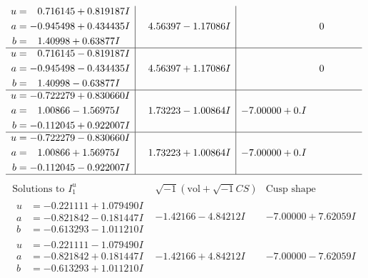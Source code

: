 \documentclass[1p]{elsarticle_modified}
\theoremstyle{definition}
\newcommand{\I}{\sqrt{-1}}
\begin{document}
$$\begin{array}{c|c|c}
\begin{aligned}
u &= \phantom{-}0.716145 + 0.819187 I \\
a &= -0.945498 + 0.434435 I \\
b &= \phantom{-}1.40998 + 0.63877 I\end{aligned}
 & \phantom{-}4.56397 - 1.17086 I & \phantom{-0.000000 } 0 \\ \hline\begin{aligned}
u &= \phantom{-}0.716145 - 0.819187 I \\
a &= -0.945498 - 0.434435 I \\
b &= \phantom{-}1.40998 - 0.63877 I\end{aligned}
 & \phantom{-}4.56397 + 1.17086 I & \phantom{-0.000000 } 0 \\ \hline\begin{aligned}
u &= -0.722279 + 0.830660 I \\
a &= \phantom{-}1.00866 - 1.56975 I \\
b &= -0.112045 + 0.922007 I\end{aligned}
 & \phantom{-}1.73223 - 1.00864 I & -7.00000 + 0. I\phantom{ +0.000000I} \\ \hline\begin{aligned}
u &= -0.722279 - 0.830660 I \\
a &= \phantom{-}1.00866 + 1.56975 I \\
b &= -0.112045 - 0.922007 I\end{aligned}
 & \phantom{-}1.73223 + 1.00864 I & -7.00000 + 0. I\phantom{ +0.000000I}\\
 \hline 
 \end{array}$$\newpage$$\begin{array}{c|c|c}  
\text{Solutions to }I^u_{1}& \I (\text{vol} + \sqrt{-1}CS) & \text{Cusp shape}\\
 \hline 
\begin{aligned}
u &= -0.221111 + 1.079490 I \\
a &= -0.821842 - 0.181447 I \\
b &= -0.613293 - 1.011210 I\end{aligned}
 & -1.42166 - 4.84212 I & -7.00000 + 7.62059 I \\ \hline\begin{aligned}
u &= -0.221111 - 1.079490 I \\
a &= -0.821842 + 0.181447 I \\
b &= -0.613293 + 1.011210 I\end{aligned}
 & -1.42166 + 4.84212 I & -7.00000 - 7.62059 I \\ \hline\begin{aligned}

\end{aligned}
\end{array}$$
\end{document}
